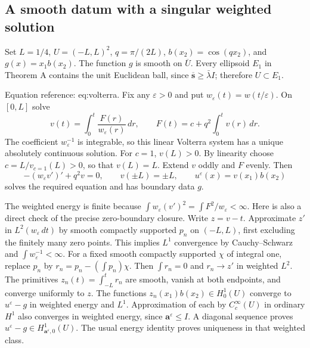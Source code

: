 \documentclass[10pt]{article}
\begin{document}
\subsection*{A smooth datum with a singular weighted solution}
Set \(L=1/4\), \(U=(-L,L)^2\), \(q=\pi/(2L)\), \(b(x_2)=\cos(qx_2)\), and \(g(x)=x_1b(x_2)\). The function \(g\) is smooth on \(\overline U\). Every ellipsoid \(E_1\) in Theorem A contains the unit Euclidean ball, since \(\overline{\mathbf s}\ge\bar\lambda I\); therefore \(U\subset E_1\).\par
Equation reference: eq:volterra. Fix any \(\varepsilon>0\) and put \(w_\varepsilon(t)=w(t/\varepsilon)\). On \([0,L]\) solve \[
 v(t)=\int_0^t\frac{F(r)}{w_\varepsilon(r)}\,dr,\qquad
 F(t)=c+q^2\int_0^t v(r)\,dr.\] The coefficient \(w_\varepsilon^{-1}\) is integrable, so this linear Volterra system has a unique absolutely continuous solution. For \(c=1\), \(v(L)>0\). By linearity choose \(c=L/v_{c=1}(L)>0\), so that \(v(L)=L\). Extend \(v\) oddly and \(F\) evenly. Then \[-(w_\varepsilon v')'+q^2v=0,\qquad v(\pm L)=\pm L,
 \qquad u^\varepsilon(x)=v(x_1)b(x_2)\] solves the required equation and has boundary data \(g\).\par
The weighted energy is finite because \(\int w_\varepsilon(v')^2=\int F^2/w_\varepsilon<\infty\). Here is also a direct check of the precise zero-boundary closure. Write \(z=v-t\). Approximate \(z'\) in \(L^2(w_\varepsilon\,dt)\) by smooth compactly supported \(p_n\) on \((-L,L)\), first excluding the finitely many zero points. This implies \(L^1\) convergence by Cauchy–Schwarz and \(\int w_\varepsilon^{-1}<\infty\). For a fixed smooth compactly supported \(\chi\) of integral one, replace \(p_n\) by \(r_n=p_n-(\int p_n)\chi\). Then \(\int r_n=0\) and \(r_n\to z'\) in weighted \(L^2\). The primitives \(z_n(t)=\int_{-L}^t r_n\) are smooth, vanish at both endpoints, and converge uniformly to \(z\). The functions \(z_n(x_1)b(x_2)\in H^1_0(U)\) converge to \(u^\varepsilon-g\) in weighted energy and \(L^1\). Approximation of each by \(C_c^\infty(U)\) in ordinary \(H^1\) also converges in weighted energy, since \(\mathbf a^\varepsilon\le I\). A diagonal sequence proves \(u^\varepsilon-g\in H^1_{\mathbf a^\varepsilon,0}(U)\). The usual energy identity proves uniqueness in that weighted class.\par
\end{document}
